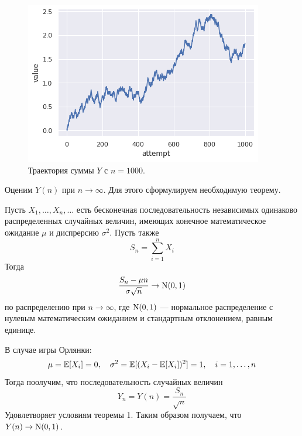 \begin{figure}[h]
	\begin{center}
		\includegraphics[width=0.75\linewidth]{"./resources/toss_game.png"}
		\caption{Траектория суммы $Y$ с $n = 1000$.}
	\end{center}
\end{figure}

Оценим $Y(n)$ при $n \to \infty$. Для этого сформулируем необходимую
 теорему.
\begin{theorem}
     Пусть $X_1,\dots, X_n,\dots$ есть бесконечная
      последовательность независимых одинаково распределенных случайных
      величин, имеющих конечное математическое ожидание $\mu$ и
      диспрерсию $\sigma^2$. Пусть также
     $$
     S_n = \displaystyle\sum_{i = 1}^n X_i
     $$
     Тогда
     $$
     \dfrac{S_n - \mu n}{\sigma \sqrt{n}} \to \operatorname{N}(0,1)
     $$
     по распределению при $n \to \infty$,
     где $\operatorname{N}(0,1)$ --- нормальное распределение с нулевым математическим ожиданием
      и стандартным отклонением, равным единице.
\end{theorem}

В случае игры Орлянки:
$$
\mu = \operatorname{\mathbb{E}}[X_i] = 0, \quad
\sigma^2 = \operatorname{\mathbb{E}}[(X_i - \operatorname{\mathbb{E}}[X_i])^2] = 1, \quad i = 1, \dots, n
$$
Тогда поолучим, что последовательность случайных величин
$$
Y_n = Y(n) = \dfrac{S_n}{\sqrt{n}}
$$
Удовлетворяет условиям теоремы 1. Таким образом получаем, что $Y(n) \to \operatorname{N}(0,1)$.